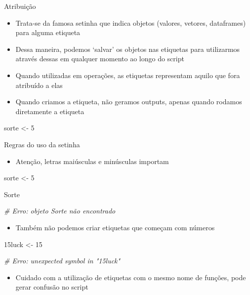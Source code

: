 \documentclass[
  10pt,
  ignorenonframetext,
]{beamer}
\newenvironment{Shaded}{\begin{snugshade}}{\end{snugshade}}
\newcommand{\CommentTok}[1]{\textcolor[rgb]{0.56,0.35,0.01}{\textit{#1}}}
\newcommand{\DecValTok}[1]{\textcolor[rgb]{0.00,0.00,0.81}{#1}}
\newcommand{\NormalTok}[1]{#1}
\newcommand{\StringTok}[1]{\textcolor[rgb]{0.31,0.60,0.02}{#1}}
\providecommand{\tightlist}{%
  \setlength{\itemsep}{0pt}\setlength{\parskip}{0pt}}
\begin{document}
\begin{frame}[fragile]{Atribuição}
\protect\hypertarget{atribuiuxe7uxe3o}{}
\begin{itemize}
\tightlist
\item
  Trata-se da famosa setinha que indica objetos (valores, vetores,
  dataframes) para alguma etiqueta
\item
  Dessa maneira, podemos `salvar' os objetos nas etiquetas para
  utilizarmos através dessas em qualquer momento ao longo do script
\item
  Quando utilizadas em operações, as etiquetas representam aquilo que
  fora atribuído a elas
\item
  Quando criamos a etiqueta, não geramos outputs, apenas quando rodamos
  diretamente a etiqueta
\end{itemize}

\begin{Shaded}
\begin{Highlighting}[]
\NormalTok{sorte \textless{}{-}}\StringTok{ }\DecValTok{5}
\end{Highlighting}
\end{Shaded}
\end{frame}

\begin{frame}[fragile]{Regras do uso da setinha}
\protect\hypertarget{regras-do-uso-da-setinha}{}
\begin{itemize}
\tightlist
\item
  Atenção, letras maiúsculas e minúsculas importam
\end{itemize}

\begin{Shaded}
\begin{Highlighting}[]
\NormalTok{sorte \textless{}{-}}\StringTok{ }\DecValTok{5}

\NormalTok{Sorte}

\CommentTok{\# Erro: objeto \textquotesingle{}Sorte\textquotesingle{} não encontrado}
\end{Highlighting}
\end{Shaded}

\begin{itemize}
\tightlist
\item
  Também não podemos criar etiquetas que começam com números
\end{itemize}

\begin{Shaded}
\begin{Highlighting}[]
\NormalTok{15luck \textless{}{-}}\StringTok{ }\DecValTok{15}

\CommentTok{\# Erro: unexpected symbol in "15luck"}
\end{Highlighting}
\end{Shaded}

\begin{itemize}
\tightlist
\item
  Cuidado com a utilização de etiquetas com o mesmo nome de funções,
  pode gerar confusão no script
\end{itemize}
\end{frame}
\end{document}
